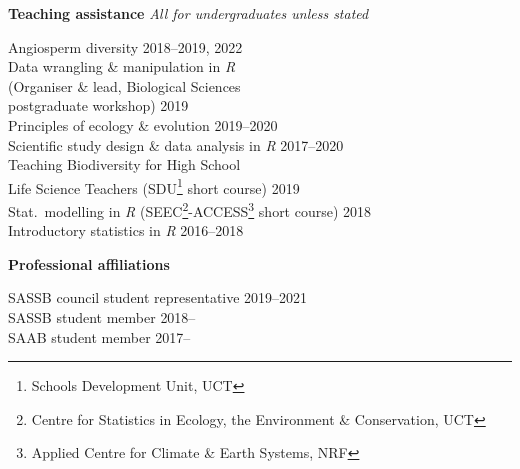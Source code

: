 \documentclass[10pt]{article}
\begin{document}
\begin{multicols}{2}
\columnbreak

\textbf{Teaching assistance} %
                   \hfill {\small \textit{All for undergraduates unless stated}}

Angiosperm diversity                         \hfill {\small 2018--2019, 2022} \\
Data wrangling \& manipulation in \textit{R}                                  \\
\hspace{2em} {\small (Organiser \& lead,
  Biological Sciences}                                                        \\
\hspace{2em} {\small postgraduate workshop)} \hfill {\small             2019} \\
Principles of ecology \& evolution           \hfill {\small       2019--2020} \\
Scientific study design \& data analysis in
  \textit{R}                                 \hfill {\small       2017--2020} \\
Teaching Biodiversity for High School                                         \\
\hspace{2em} Life Science Teachers {\small
  (SDU\footnote{Schools Development Unit,
  UCT} short course)}                        \hfill {\small             2019} \\
Stat.~modelling in \textit{R} {\small
  (SEEC\footnote{Centre for Statistics in
  Ecology, the Environment \&
  Conservation, UCT}-ACCESS\footnote{Applied
  Centre for Climate \& Earth Systems, NRF}
  short course)}                             \hfill {\small             2018} \\
Introductory statistics in \textit{R}        \hfill {\small       2016--2018}

\textbf{Professional affiliations} %

SASSB council student representative               \hfill {\small 2019--2021} \\
SASSB student member                               \hfill {\small 2018--    } \\
SAAB student member                                \hfill {\small 2017--    } \\

\end{multicols} %
\end{document}

